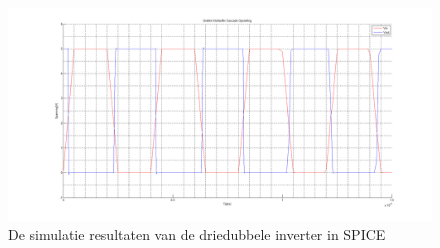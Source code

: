\begin{figure} [h!]
\centering
\includegraphics [width = \textwidth] {inputfiles/GrafiekCascade}
\caption{De simulatie resultaten van de driedubbele inverter in SPICE}
\label{E2}
\end{figure}

